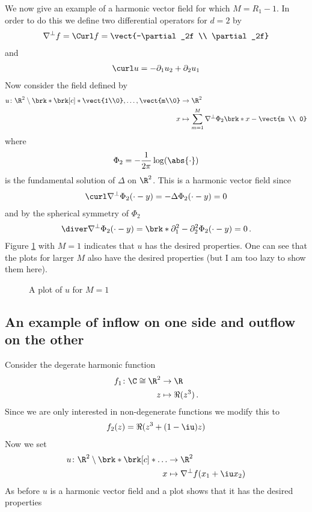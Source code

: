We now give an example of a harmonic vector field
for which $M=R_1-1$. In order to do this we define two differential operators for $d=2$ by
\begin{align*}
  \nabla^\perp f=\Curl f=\vect{-\partial_2f \\ \partial_2f}
\end{align*}
and
\begin{align*}
  \curl u=-\partial_1u_2+\partial_2u_1
\end{align*}
Now consider the field defined by
\begin{align*}
  u\colon\R^2\setminus\brk*{\brk[c]*{\vect{1\\0},\dots,\vect{m\\0}}}&\to\R^2 \\
  x&\mapsto\sum_{m=1}^M\nabla^\perp\Phi_2\brk*{x-\vect{m \\ 0}}
\end{align*}
where
\begin{align*}
  \Phi_2=-\frac{1}{2\pi}\log(\abs{\cdot})
\end{align*}
is the fundamental solution of $\Delta$ on $\R^2$. This is a harmonic vector field since
\begin{align*}
  \curl \nabla^\perp\Phi_2(\cdot-y)= -\Delta\Phi_2(\cdot-y)=0
\end{align*}
and by the spherical symmetry of $\Phi_2$
\begin{align*}
  \diver \nabla^\perp\Phi_2(\cdot-y) = \brk*{\partial_1^2-\partial_2^2}\Phi_2(\cdot-y)=0\,.
\end{align*}
Figure \ref{pl:n2_hvf_noInflowNoOutflow} with $M=1$ indicates that $u$ has the desired properties. One can see that
the plots for larger
$M$ also have the desired properties (but I am too lazy to show them here).
\begin{figure}
  \centering
  
  \caption{A plot of $u$ for $M=1$ }
  \label{pl:n2_hvf_noInflowNoOutflow}
\end{figure}


\subsection{An example of inflow on one side and outflow on the other}
Consider the degerate harmonic function
\begin{align*}
  f_1\colon\C\cong\R^2&\to\R \\
  z&\mapsto \Re(z^3)\,.
\end{align*}
Since we are only interested in non-degenerate functions we modify this to
\begin{align*}
  f_2(z)=\Re(z^3+(1-\iu)z)
\end{align*}
Now we set
\begin{align*}
  u\colon\R^2\setminus\brk*{\brk[c]*{\dots}}&\to\R^2 \\
  x&\mapsto\nabla^\perp f(x_1+\iu x_2)
\end{align*}
As before $u$ is a harmonic vector field and a plot shows that it has the desired properties



